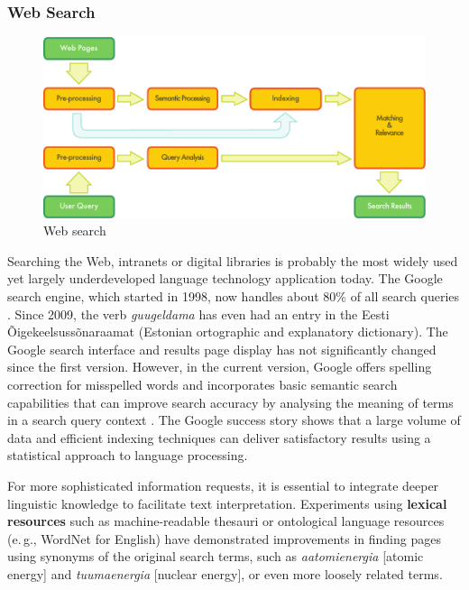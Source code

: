 \begin{multicols}{2}
\subsubsection{Web Search}

\begin{figure}[htb]
  \center
  \includegraphics[width=\textwidth]{../_media/english/web_search_architecture}
  \caption{Web search}
  \label{fig:websearcharch_en}
 \end{figure}

Searching the Web, intranets or digital libraries is probably the most widely used yet largely underdeveloped language technology application today. The Google search engine, which started in 1998, now handles about 80\% of all search queries \cite{spi1}. Since 2009, the verb \textit{guugeldama} has even had an entry in the Eesti Õigekeelsussõnaraamat (Estonian ortographic and explanatory dictionary). The Google search interface and results page display has not significantly changed since the first version. However, in the current version, Google offers spelling correction for misspelled words and incorporates basic semantic search capabilities that can improve search accuracy by analysing the meaning of terms in a search query context \cite{pc1}. The Google success story shows that a large volume of data and efficient indexing techniques can deliver satisfactory results using a statistical approach to language processing. 

For more sophisticated information requests, it is essential to integrate deeper linguistic knowledge to facilitate text interpretation. Experiments using \textbf{lexical resources} such as machine-readable thesauri or ontological language resources (e.\,g., WordNet for English) have demonstrated improvements in finding pages using synonyms of the original search terms, such as \textit{aatomienergia} {[}atomic energy{]} and \textit{tuumaenergia} {[}nuclear energy{]}, or even more loosely related terms.


\end{multicols}
